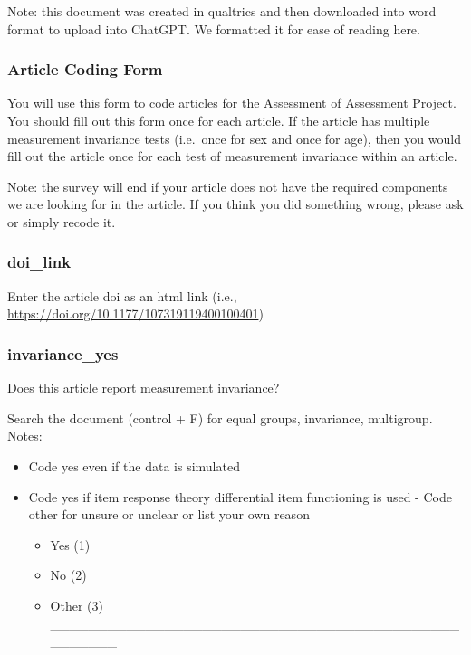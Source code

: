 \documentclass[
  english,
  man]{apa7}
\providecommand{\tightlist}{%
  \setlength{\itemsep}{0pt}\setlength{\parskip}{0pt}}
\begin{document}
Note: this document was created in qualtrics and then downloaded into word format to upload into ChatGPT. We formatted it for ease of reading here.

\subsubsection{Article Coding Form}\label{article-coding-form}

You will use this form to code articles for the Assessment of Assessment Project. You should fill out this form once for each article. If the article has multiple measurement invariance tests (i.e.~once for sex and once for age), then you would fill out the article once for each test of measurement invariance within an article.

Note: the survey will end if your article does not have the required components we are looking for in the article. If you think you did something wrong, please ask or simply recode it.

\subsubsection{doi\_link}\label{doi_link}

Enter the article doi as an html link (i.e., \url{https://doi.org/10.1177/107319119400100401})

\subsubsection{invariance\_yes}\label{invariance_yes}

Does this article report measurement invariance?

Search the document (control + F) for equal groups, invariance, multigroup. Notes:

\begin{itemize}
\item
  Code yes even if the data is simulated
\item
  Code yes if item response theory differential item functioning is used - Code other for unsure or unclear or list your own reason

  \begin{itemize}
  \tightlist
  \item
    Yes (1)
  \item
    No (2)
  \item
    Other (3) \_\_\_\_\_\_\_\_\_\_\_\_\_\_\_\_\_\_\_\_\_\_\_\_\_\_\_\_\_\_\_\_\_\_\_\_\_\_\_\_\_\_\_\_\_\_\_\_\_\_
  \end{itemize}
\end{itemize}
\end{document}
